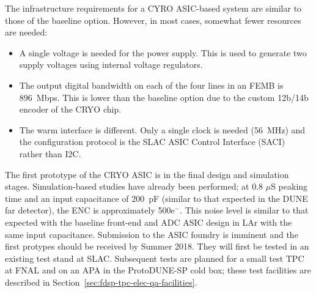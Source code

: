 The infrastructure requirements for a CYRO ASIC-based system are similar to those of the baseline option. However, in most cases, somewhat fewer resources are needed:
\begin{itemize}
\item{A single voltage is needed for the power supply. This is used to generate two supply voltages using internal voltage regulators.}
\item{The output digital bandwidth on each of the four lines in an FEMB is 896~Mbps. This is lower than the baseline option due to the custom 12b/14b encoder of the CRYO chip. }
\item{The warm interface is different. Only a single clock is needed (56~MHz) and the configuration protocol is the SLAC ASIC Control Interface (SACI)~\cite{SACI} rather than I2C.}
\end{itemize}

The first prototype of the CRYO ASIC is in the final design and simulation stages. Simulation-based studies have already been performed; at 0.8 $\mu$S peaking time and an input capacitance of 200~pF (similar to that expected in the DUNE far detector), the ENC is approximately 500e$^-$.  This noise level is similar to that expected with the baseline front-end and ADC ASIC design in LAr with the same input capacitance.  Submission to the ASIC foundry is imminent and the first protypes should be received by Summer 2018. They will first be tested in an existing test stand at SLAC. Subsequent tests are planned for a small test TPC at FNAL and on an APA in the ProtoDUNE-SP cold box; these test facilities are described in Section~\ref{sec:fdsp-tpc-elec-qa-facilities}.

